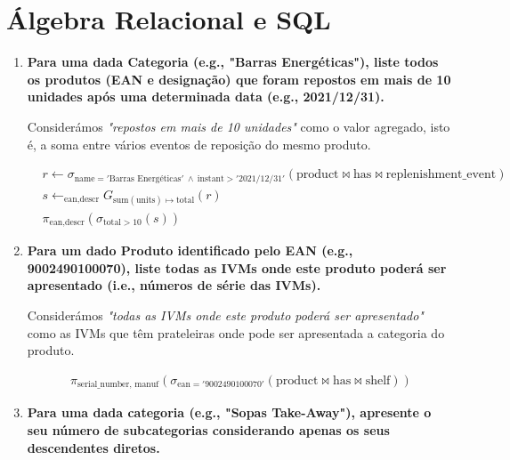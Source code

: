 \documentclass[12pt,a4paper]{article}
\newcommand{\op}{\text}
\begin{document}
  \section*{Álgebra Relacional e SQL}

  \begin{enumerate}
    \item \textbf{Para uma dada Categoria (e.g., "Barras Energéticas"), liste todos os produtos (EAN e designação) que foram repostos em mais de 10 unidades após uma determinada data (e.g., 2021/12/31).}

    Considerámos \textit{"repostos em mais de 10 unidades"} como o valor agregado, isto é, a soma entre vários eventos de reposição do mesmo produto.

    \[
      \begin{aligned}
        &r \leftarrow \sigma_{\op{name}='\text{Barras Energéticas}'~\land~\op{instant} > '\text{2021/12/31}'}(\op{product} \bowtie \op{has} \bowtie \op{replenishment\_event})\\
        &s \leftarrow _{\op{ean}, \op{descr}} G_{\op{sum}(\op{units}) \mapsto \op{total}}(r)\\
        &\pi_{\op{ean}, \op{descr}} \left(\sigma_{\op{total} > 10}\left(s\right)\right)
      \end{aligned}
    \]

    

    \item \textbf{Para um dado Produto identificado pelo EAN (e.g., 9002490100070), liste todas as IVMs onde este produto poderá ser apresentado (i.e., números de série das IVMs).}
      
    Considerámos \textit{"todas as IVMs onde este produto poderá ser apresentado"} como as IVMs que têm prateleiras onde pode ser apresentada a categoria do produto.

    \[
      \begin{aligned}
        \pi_{\op{serial\_number, manuf}}\left(\sigma_{\op{ean}='9002490100070'}\left(\op{product} \bowtie \op{has} \bowtie \op{shelf}\right)\right)
      \end{aligned}
    \]

    

    \item \textbf{Para uma dada categoria (e.g., "Sopas Take-Away"), apresente o seu número de subcategorias considerando apenas os seus descendentes diretos.}


\end{enumerate}
\end{document}
